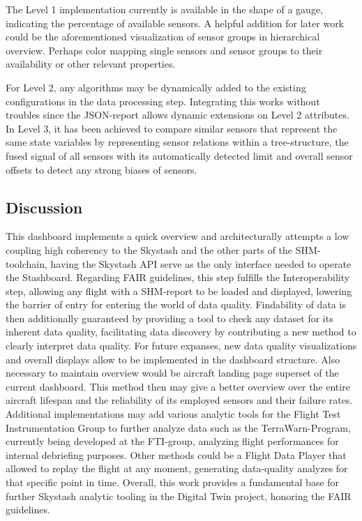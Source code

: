 The Level 1 implementation currently is available in the shape of a gauge, indicating the percentage of available sensors. A helpful addition for later work could be the aforementioned visualization of sensor groups in hierarchical overview. Perhaps color mapping single sensors and sensor groups to their availability or other relevant properties.

For Level 2, any algorithms may be dynamically added to the existing configurations in the data processing step. Integrating this works without troubles since the JSON-report allows dynamic extensions on Level 2 attributes.
In Level 3, it has been achieved to compare similar sensors that represent the same state variables by representing sensor relations within a tree-structure, the fused signal of all sensors with its automatically detected limit and overall sensor offsets to detect any strong biases of sensors.

\subsection{Discussion}

This dashboard implements a quick overview and architecturally attempts a low coupling high coherency to the Skystash and the other parts of the SHM-toolchain, having the Skystash API serve as the only interface needed to operate the Stashboard.
Regarding FAIR guidelines, this step fulfills the Interoperability step, allowing any flight with a SHM-report to be loaded and displayed, lowering the barrier of entry for entering the world of data quality. Findability of data is then additionally guaranteed by providing a tool to check any dataset for its inherent data quality, facilitating data discovery by contributing a new method to clearly interpret data quality.
For future expanses, new data quality visualizations and overall displays allow to be implemented in the dashboard structure. Also necessary to maintain overview would be aircraft landing page superset of the current dashboard. This method then may give a better overview over the entire aircraft lifespan and the reliability of its employed sensors and their failure rates. Additional implementations may add various analytic tools for the Flight Test Instrumentation Group to further analyze data such as the TerraWarn-Program, currently being developed at the FTI-group, analyzing flight performances for internal debriefing purposes. Other methods could be a Flight Data Player that allowed to replay the flight at any moment, generating data-quality analyzes for that specific point in time. Overall, this work provides a fundamental base for further Skystash analytic tooling in the Digital Twin project, honoring the FAIR guidelines.


